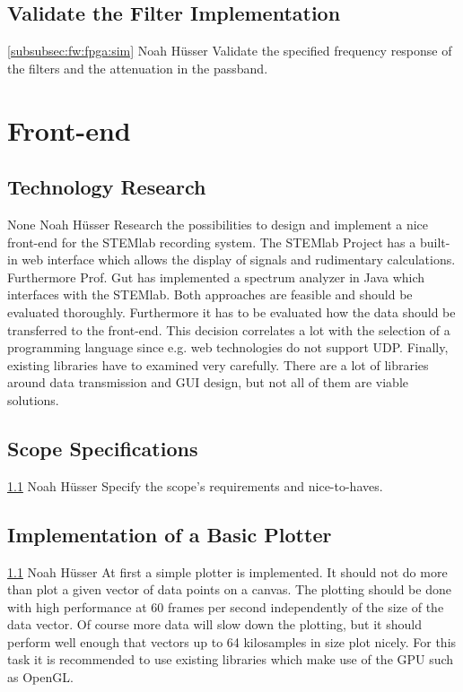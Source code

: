 \documentclass[a4paper,oneside]{alpenspecs/alpenspecs}
\begin{document}
\subsection{Validate the Filter Implementation}
\label{subsec:validation:impl}
\wpac
    {}
    {}
    {}
    {\ref{subsubsec:fw:fpga:sim}}
    {}
    {Noah Hüsser}
    {%
        Validate  the specified  frequency  response of  the  filters and  the
        attenuation in the passband.
    }

\section{Front-end}
\label{sec:frontend}

\subsection{Technology Research}
\label{subsec:frontend:research}
\wpac
    {}
    {}
    {}
    {None}
    {}
    {Noah Hüsser}
    {%
        Research the possibilities to design and implement a nice front-end for
        the STEMlab recording system.
        The  STEMlab Project  has a  built-in web  interface which  allows the
        display of signals and rudimentary calculations.
        Furthermore  Prof. Gut has  implemented  a spectrum  analyzer in  Java
        which interfaces with the STEMlab.
        Both approaches are feasible and should be evaluated thoroughly.
        Furthermore it has to be evaluated  how the data should be transferred
        to the front-end.
        This decision  correlates a  lot with the  selection of  a programming
        language since e.g. web technologies do not support UDP.
        Finally, existing libraries have to examined very carefully. There are
        a lot  of libraries around data  transmission and GUI design,  but not
        all of them are viable solutions.
    }

\subsection{Scope Specifications}
\label{subsec:frontend:specify}
\wpac
    {}
    {}
    {}
    {\ref{subsec:frontend:research}}
    {}
    {Noah Hüsser}
    {%
        Specify the scope's requirements and nice-to-haves.
    }

\subsection{Implementation of a Basic Plotter}
\label{subsec:frontend:plotter}
\wpac
    {}
    {}
    {}
    {\ref{subsec:frontend:research}}
    {}
    {Noah Hüsser}
    {%
        At first a  simple plotter is implemented. It should  not do more
        than plot a given vector of data points on a canvas.
        The plotting  should be done  with high  performance at 60  frames per
        second independently of the size of the data vector.
        Of course more data will slow down the plotting, but it should perform
        well enough that vectors up to 64 kilosamples in size plot nicely.
        For this task  it is recommended to use existing  libraries which make
        use of the GPU such as OpenGL.
    }
\end{document}
